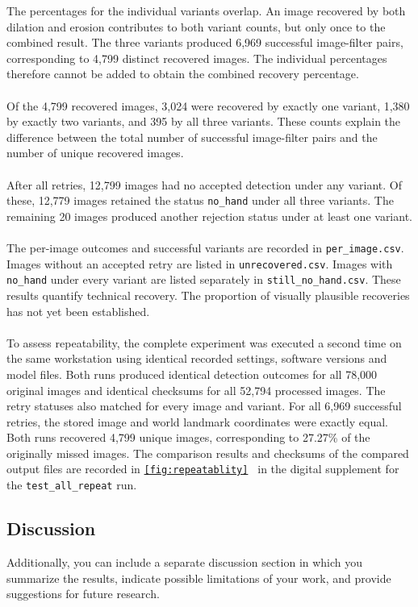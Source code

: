         The percentages for the individual variants overlap. An image recovered by both dilation and erosion contributes to both variant counts, but only once to the combined result. The three variants produced 6,969 successful image-filter pairs, corresponding to 4,799 distinct recovered images. The individual percentages therefore cannot be added to obtain the combined recovery percentage.
        \\\\
        Of the 4,799 recovered images, 3,024 were recovered by exactly one variant, 1,380 by exactly two variants, and 395 by all three variants. These counts explain the difference between the total number of successful image-filter pairs and the number of unique recovered images.
        \\\\
        After all retries, 12,799 images had no accepted detection under any variant. Of these, 12,779 images retained the status \texttt{no\_hand} under all three variants. The remaining 20 images produced another rejection status under at least one variant.
        \\\\
        The per-image outcomes and successful variants are recorded in \texttt{per\_image.csv}. Images without an accepted retry are listed in \texttt{unrecovered.csv}. Images with \texttt{no\_hand} under every variant are listed separately in \texttt{still\_no\_hand.csv}. These results quantify technical recovery. The proportion of visually plausible recoveries has not yet been established.
        \\\\
        To assess repeatability, the complete experiment was executed a second time on the same workstation using identical recorded settings, software versions and model files. Both runs produced identical detection outcomes for all 78,000 original images and identical checksums for all 52,794 processed images. The retry statuses also matched for every image and variant. For all 6,969 successful retries, the stored image and world landmark coordinates were exactly equal. Both runs recovered 4,799 unique images, corresponding to 27.27\% of the originally missed images. The comparison results and checksums of the compared output files are recorded in \texttt{\ref{fig:repeatablity} } in the digital supplement for the \texttt{test\_all\_repeat} run.
        
    \subsection{Discussion}
\iffalse
        Additionally, you can include a separate discussion section in which you summarize the results, indicate possible limitations of your work, and provide suggestions for future research.

